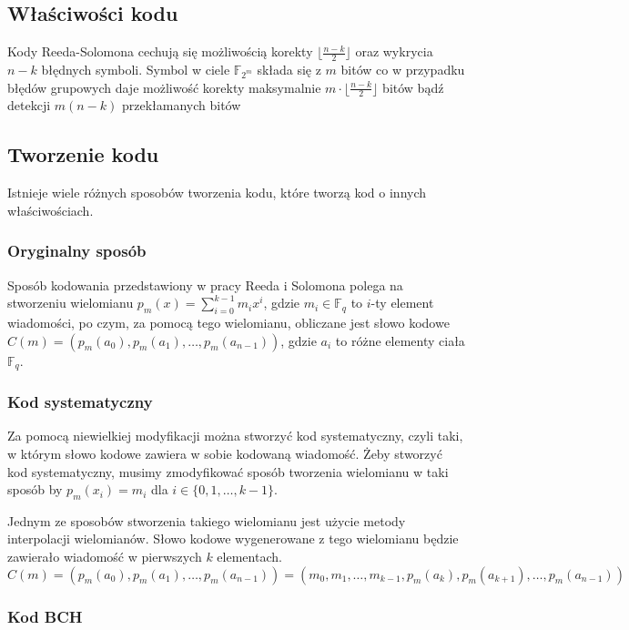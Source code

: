 \subsection{Właściwości kodu}
Kody Reeda-Solomona cechują się możliwością korekty $\lfloor \frac{n-k}{2} \rfloor$
oraz wykrycia $n-k$ błędnych symboli. Symbol w ciele $\mathbb{F}_{2^m}$ składa się
z $m$ bitów co w przypadku błędów grupowych daje możliwość korekty maksymalnie
$m \cdot \lfloor \frac{n-k}{2} \rfloor$ bitów bądź detekcji $m(n-k)$ przekłamanych
bitów

\subsection{Tworzenie kodu}
Istnieje wiele różnych sposobów tworzenia kodu, które tworzą kod o innych właściwościach.


\subsubsection{Oryginalny sposób}
Sposób kodowania przedstawiony w pracy Reeda i Solomona polega na stworzeniu wielomianu $p_m(x)=\sum_{i=0}^{k-1}m_{i}x^i$, gdzie $m_i\in\mathbb{F}_q$ to $i$\nobreakdash-ty element wiadomości, po czym, za pomocą tego wielomianu, obliczane jest słowo kodowe $C(m)=(p_m(a_0), p_m(a_1), \ldots, p_m(a_{n-1}))$, gdzie $a_i$ to różne elementy ciała $\mathbb{F}_q$.

\subsubsection{Kod systematyczny}
\label{subsection:Kod systematyczny}
Za pomocą niewielkiej modyfikacji można stworzyć kod systematyczny, czyli taki, w którym słowo kodowe zawiera w sobie kodowaną wiadomość.
Żeby stworzyć kod systematyczny, musimy zmodyfikować sposób tworzenia wielomianu w taki sposób by $p_m(x_i)=m_i$ dla $i \in \{0,1,\ldots,k-1\}$.

Jednym ze sposobów stworzenia takiego wielomianu jest użycie metody interpolacji wielomianów. Słowo kodowe wygenerowane z tego wielomianu będzie zawierało wiadomość w pierwszych $k$ elementach.
\[C(m)=(p_m(a_0), p_m(a_1), \ldots, p_m(a_{n-1})) = (m_0, m_1, \ldots, m_{k-1}, p_m(a_k), p_m(a_{k+1}), \ldots, p_m(a_{n-1}))\]

\subsubsection{Kod BCH}

